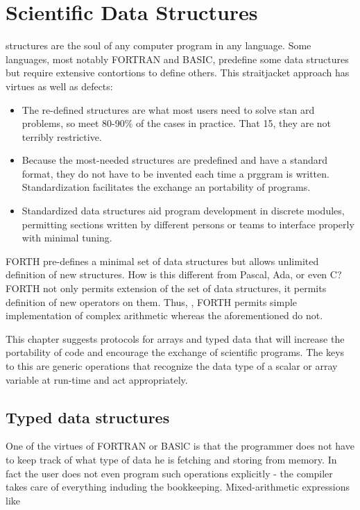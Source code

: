 \chapter{Scientific Data Structures}
\startcontents[chapters]

 structures are the soul of any computer program in any language. Some languages, most notably FORTRAN and BASIC, predefine some data structures but require extensive contortions to define others. This straitjacket approach has virtues as well as defects:

\begin{itemize}
    \item The re-defined structures are what most users need to solve stan ard problems, so meet 80-90\% of the cases in practice. That 15, they are not terribly restrictive.
    \item Because the most-needed structures are predefined and have a standard format, they do not have to be invented each time a prggram is written. Standardization facilitates the exchange an portability of programs.
    \item Standardized data structures aid program development in discrete modules, permitting sections written by different persons or teams to interface properly with minimal tuning.
\end{itemize}

FORTH pre-defines a minimal set of data structures but allows unlimited definition of new structures. How is this different from Pascal, Ada, or even C? FORTH not only permits extension of the set of data structures, it permits definition of new operators on them. Thus, \eg, FORTH permits simple implementation of complex arithmetic whereas the aforementioned do not.

This chapter suggests protocols for arrays and typed data that will increase the portability of code and encourage the exchange of scientific programs. The keys to this are generic operations that recognize the data type of a scalar or array variable at run-time and act appropriately.

\section{Typed data structures}

One of the virtues of FORTRAN or BASlC is that the programmer does not have to keep track of what type of data he is fetching and storing from memory. In fact the user does not even program such operations explicitly - the compiler takes care of everything induding the bookkeeping. Mixed-arithmetic expressions like

